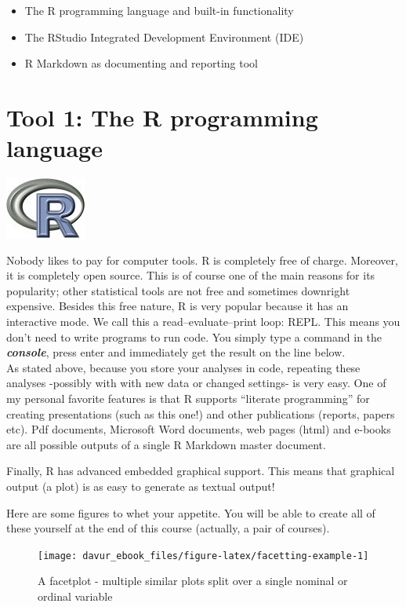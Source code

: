 \documentclass[]{book}
\providecommand{\tightlist}{%
  \setlength{\itemsep}{0pt}\setlength{\parskip}{0pt}}
\begin{document}
\begin{itemize}
\tightlist
\item
  The R programming language and built-in functionality
\item
  The RStudio Integrated Development Environment (IDE)
\item
  R Markdown as documenting and reporting tool
\end{itemize}

\hypertarget{tool-1-the-r-programming-language}{%
\section{Tool 1: The R programming language}\label{tool-1-the-r-programming-language}}

\includegraphics{figures/Rlogo.jpg}

Nobody likes to pay for computer tools. R is completely free of charge. Moreover, it is completely open source. This is of course one of the main reasons for its popularity; other statistical tools are not free and sometimes downright expensive.
Besides this free nature, R is very popular because it has an interactive mode. We call this a read--evaluate--print loop: REPL. This means you don't need to write programs to run code. You simply type a command in the \textbf{\emph{console}}, press enter and immediately get the result on the line below.\\
As stated above, because you store your analyses in code, repeating these analyses -possibly with with new data or changed settings- is very easy.
One of my personal favorite features is that R supports ``literate programming'' for creating presentations (such as this one!) and other publications (reports, papers etc). Pdf documents, Microsoft Word documents, web pages (html) and e-books are all possible outputs of a single R Markdown master document.

Finally, R has advanced embedded graphical support. This means that graphical output (a plot) is as easy to generate as textual output!

Here are some figures to whet your appetite. You will be able to create all of these yourself at the end of this course (actually, a pair of courses).

\begin{figure}

{\centering \texttt{[image: davur\_ebook\_files/figure-latex/facetting-example-1]} 

}

\caption{A facetplot - multiple similar plots split over a single nominal or ordinal variable}\label{fig:facetting-example}
\end{figure}
\end{document}
